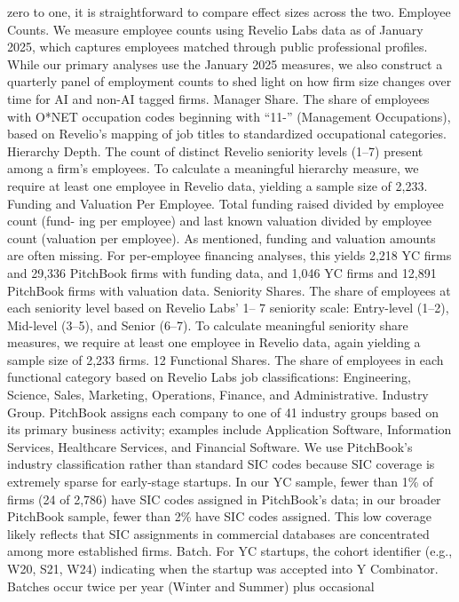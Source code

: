 zero to one, it is straightforward to compare effect sizes across the two.
Employee Counts.
We measure employee counts using Revelio Labs data as of January 2025,
which captures employees matched through public professional profiles. While our primary analyses
use the January 2025 measures, we also construct a quarterly panel of employment counts to shed
light on how firm size changes over time for AI and non-AI tagged firms.
Manager Share.
The share of employees with O*NET occupation codes beginning with “11-”
(Management Occupations), based on Revelio’s mapping of job titles to standardized occupational
categories.
Hierarchy Depth.
The count of distinct Revelio seniority levels (1–7) present among a firm’s
employees. To calculate a meaningful hierarchy measure, we require at least one employee in Revelio
data, yielding a sample size of 2,233.
Funding and Valuation Per Employee.
Total funding raised divided by employee count (fund-
ing per employee) and last known valuation divided by employee count (valuation per employee). As
mentioned, funding and valuation amounts are often missing. For per-employee financing analyses,
this yields 2,218 YC firms and 29,336 PitchBook firms with funding data, and 1,046 YC firms and
12,891 PitchBook firms with valuation data.
Seniority Shares.
The share of employees at each seniority level based on Revelio Labs’ 1–
7 seniority scale: Entry-level (1–2), Mid-level (3–5), and Senior (6–7). To calculate meaningful
seniority share measures, we require at least one employee in Revelio data, again yielding a sample
size of 2,233 firms.
12
Functional Shares.
The share of employees in each functional category based on Revelio Labs job
classifications: Engineering, Science, Sales, Marketing, Operations, Finance, and Administrative.
Industry Group.
PitchBook assigns each company to one of 41 industry groups based on its
primary business activity; examples include Application Software, Information Services, Healthcare
Services, and Financial Software. We use PitchBook’s industry classification rather than standard
SIC codes because SIC coverage is extremely sparse for early-stage startups. In our YC sample,
fewer than 1\% of firms (24 of 2,786) have SIC codes assigned in PitchBook’s data; in our broader
PitchBook sample, fewer than 2\% have SIC codes assigned. This low coverage likely reflects that
SIC assignments in commercial databases are concentrated among more established firms.
Batch.
For YC startups, the cohort identifier (e.g., W20, S21, W24) indicating when the startup
was accepted into Y Combinator. Batches occur twice per year (Winter and Summer) plus occasional
